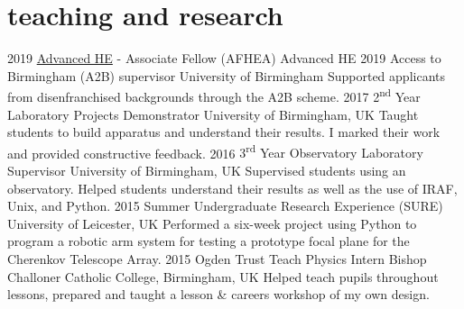 \documentclass[letterpaper]{k-cv} %
\begin{document}
\section{\color{c2}teaching and research}
\begin{entrylist}
	\centry
	{2019}
	{\href{https://www.heacademy.ac.uk/individuals/fellowship}{Advanced HE} - \textcolor{c2}{Associate Fellow} (AFHEA)}
	{Advanced HE}
	{}
	\centry
	{2019}
	{Access to Birmingham (A2B) supervisor}
	{University of Birmingham}
	{Supported applicants from disenfranchised backgrounds through the A2B scheme.}
	\centry
	{2017 }
	{2\textsuperscript{nd} Year Laboratory Projects Demonstrator}
	{University of Birmingham, UK}
	{Taught students to build apparatus and understand their results. I marked their work and provided constructive feedback.}
	\centry
	{2016 }
	{3\textsuperscript{rd} Year Observatory Laboratory Supervisor}
	{University of Birmingham, UK}
	{Supervised students using an observatory. Helped students understand their results as well as the use of IRAF, Unix, and Python.}
	\centry
	{2015}
	{Summer Undergraduate Research Experience (SURE)}
	{University of Leicester, UK}
	{Performed a six-week project using Python to program a robotic arm system for testing a prototype focal plane for the Cherenkov Telescope Array.}
	\centry
	{2015}
	{Ogden Trust Teach Physics Intern}
	{Bishop Challoner Catholic College, Birmingham, UK}
	{Helped teach pupils throughout lessons, prepared and taught a lesson \& careers workshop of my own design.}
\end{entrylist}
\end{document}
